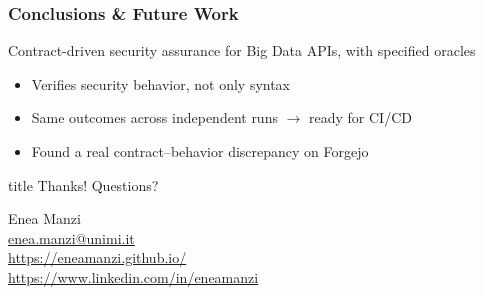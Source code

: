 
\begin{frame}
    \frametitle{Conclusions \& Future Work}

    Contract-driven security assurance for Big Data APIs, with \alert{specified oracles}
    \begin{itemize}
        \item Verifies security \alert{behavior}, not only syntax
        \item \alert{Same outcomes} across independent runs $\rightarrow$ ready for CI/CD
        \item Found a real \alert{contract--behavior discrepancy} on Forgejo
    \end{itemize}

    \vspace{.8em}

\end{frame}

\begin{frame}

    \begin{center}
        \begin{beamercolorbox}[sep=.75em]{title}
            \centering
            Thanks! Questions?%
        \end{beamercolorbox}

        \vspace{2em}

        {\large Enea Manzi}\\
        \vspace{.25em}
        {\small
            \href{mailto:enea.manzi@unimi.it}{enea.manzi@unimi.it}\\
            \href{https://eneamanzi.github.io/}{https://eneamanzi.github.io/}\\
            \href{https://www.linkedin.com/in/eneamanzi}{https://www.linkedin.com/in/eneamanzi}
        }

    \end{center}

\end{frame}
